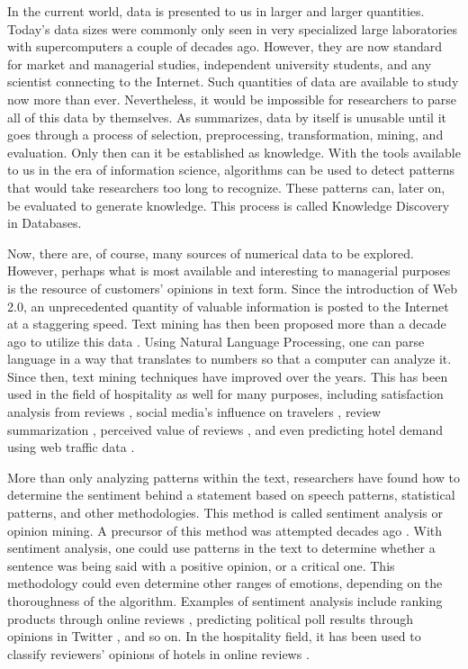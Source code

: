 \documentclass[smallextended,natbib]{svjour3}       %
\begin{document}
    In the current world, data is presented to us in larger and larger quantities. Today's data sizes were commonly only seen in very specialized large laboratories with supercomputers a couple of decades ago. However, they are now standard for market and managerial studies, independent university students, and any scientist connecting to the Internet. Such quantities of data are available to study now more than ever. Nevertheless, it would be impossible for researchers to parse all of this data by themselves. As \cite{fayyad1996data} summarizes, data by itself is unusable until it goes through a process of selection, preprocessing, transformation, mining, and evaluation. Only then can it be established as knowledge. With the tools available to us in the era of information science, algorithms can be used to detect patterns that would take researchers too long to recognize. These patterns can, later on, be evaluated to generate knowledge. This process is called Knowledge Discovery in Databases. 

    Now, there are, of course, many sources of numerical data to be explored.  However, perhaps what is most available and interesting to managerial purposes is the resource of customers' opinions in text form. Since the introduction of Web 2.0, an unprecedented quantity of valuable information is posted to the Internet at a staggering speed. Text mining has then been proposed more than a decade ago to utilize this data \cite[e.g.][]{rajman1998text,nahm2002text}. Using Natural Language Processing, one can parse language in a way that translates to numbers so that a computer can analyze it. Since then, text mining techniques have improved over the years. This has been used in the field of hospitality as well for many purposes, including satisfaction analysis from reviews \cite[e.g][]{berezina2016, xu2016, xiang2015, hargreaves2015, balbi2018}, social media's influence on travelers \cite[e.g.][]{xiang2010}, review summarization \cite[e.g.][]{hu2017436}, perceived value of reviews \cite[e.g][]{FANG2016498}, and even predicting hotel demand using web traffic data \cite[e.g][]{yang2014}.

    More than only analyzing patterns within the text, researchers have found how to determine the sentiment behind a statement based on speech patterns, statistical patterns, and other methodologies. This method is called sentiment analysis or opinion mining. A precursor of this method was attempted decades ago \cite[][]{stone1966general}. With sentiment analysis, one could use patterns in the text to determine whether a sentence was being said with a positive opinion, or a critical one. This methodology could even determine other ranges of emotions, depending on the thoroughness of the algorithm. Examples of sentiment analysis include ranking products through online reviews \cite[e.g][]{liu2017149, zhang2011}, predicting political poll results through opinions in Twitter \cite[][]{oconnor2010}, and so on. In the hospitality field, it has been used to classify reviewers' opinions of hotels in online reviews \cite[e.g.][]{kim2017362, alsmadi2018}. 
\end{document}
